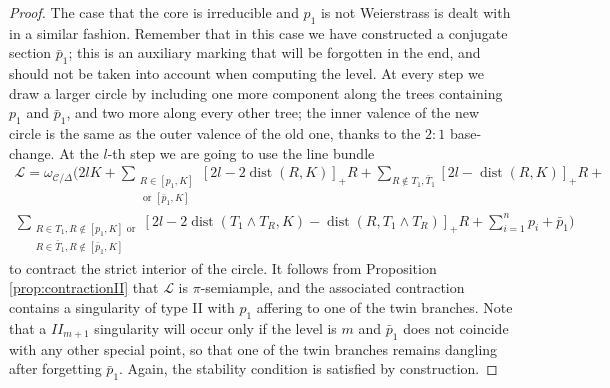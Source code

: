 \documentclass[11pt]{amsart}
\newcommand{\dvr}{\Delta}
\newcommand{\dist}{\operatorname{dist}}
\theoremstyle{plain}
\theoremstyle{definition}
\begin{document}
\begin{proof}
  The case that the core is irreducible and $p_1$ is not Weierstrass is dealt with in a similar fashion. Remember that in this case we have constructed a conjugate section $\bar p_1$; this is an auxiliary marking that will be forgotten in the end, and should not be taken into account when computing the level. At every step we draw a larger circle by including one more component along the trees containing $p_1$ and $\bar p_1$, and two more along every other tree; the inner valence of the new circle is the same as the outer valence of the old one, thanks to the $2:1$ base-change. At the $l$-th step we are going to use the line bundle
  \begin{multline*}
  \mathcal L=\omega_{\mathcal C/\dvr}(2l K + \sum_{\substack{R\in [p_1,K]\\ \text{ or }[\bar p_1,K]}}[2l-2\dist(R,K)]_+R +\sum_{R\notin T_1,\bar T_1}[2l-\dist(R,K)]_+R +\\
  \sum_{\substack{R\in T_1,R\notin [p_1,K]\text{ or} \\ R\in \bar T_1,R\notin [\bar p_1,K]}}[2l-2\dist(T_1\wedge T_R,K)-\dist(R,T_1\wedge T_R)]_+R+ \sum_{i=1}^np_i+\bar p_1)
  \end{multline*}
  to contract the strict interior of the circle. It follows from Proposition \ref{prop:contractionII} that $\mathcal L$ is $\pi$-semiample, and the associated contraction contains a singularity of type II with $p_1$ affering to one of the twin branches. Note that a $I\!I_{m+1}$ singularity will occur only if the level is $m$ and $\bar p_1$ does not coincide with any other special point, so that one of the twin branches remains dangling after forgetting $\bar p_1$. Again, the stability condition is satisfied by construction.
  
  \smallskip
  

\end{proof}
\end{document}
